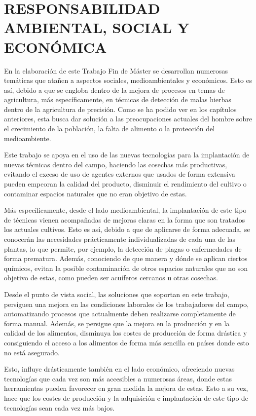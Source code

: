%

\chapter{RESPONSABILIDAD AMBIENTAL, SOCIAL Y ECONÓMICA}
\label{sec:repercusion}

En la elaboración de este Trabajo Fin de Máster se desarrollan numerosas temáticas que atañen a aspectos sociales, medioambientales y económicos. Esto es así, debido a que se engloba dentro de la mejora de procesos en temas de agricultura, más específicamente, en técnicas de detección de malas hierbas dentro de la agricultura de precisión. Como se ha podido ver en los capítulos anteriores, esta busca dar solución a las preocupaciones actuales del hombre sobre el crecimiento de la población, la falta de alimento o la protección del medioambiente.

Este trabajo se apoya en el uso de las nuevas tecnologías para la implantación de nuevas técnicas dentro del campo, haciendo las cosechas más productivas, evitando el exceso de uso de agentes externos que usados de forma extensiva pueden empeoran la calidad del producto, disminuir el rendimiento del cultivo o contaminar espacios naturales que no eran objetivo de estas.

Más específicamente, desde el lado medioambiental, la implantación de este tipo de técnicas vienen acompañadas de mejoras claras en la forma que son tratados los actuales cultivos. Esto es así, debido a que de aplicarse de forma adecuada, se conocerán las necesidades prácticamente individualizadas de cada una de las plantas, lo que permite, por ejemplo, la detección de plagas o enfermedades de forma prematura. Además, conociendo de que manera y dónde se aplican ciertos químicos, evitan la posible contaminación de otros espacios naturales que no son objetivo de estas, como pueden ser acuíferos cercanos u otras cosechas.

Desde el punto de vista social, las soluciones que soportan en este trabajo, persiguen una mejora en las condiciones laborales de los trabajadores del campo, automatizando procesos que actualmente deben realizarse completamente de forma manual. Además, se persigue que la mejora en la producción y en la calidad de los alimentos, disminuya los costes de producción de forma drástica y consiguiendo el acceso a los alimentos de forma más sencilla en países donde esto no está asegurado.

Esto, influye drásticamente también en el lado económico, ofreciendo nuevas tecnologías que cada vez son más accesibles a numerosas áreas, donde estas herramientas pueden favorecer en gran medida la mejora de estas. Esto a su vez, hace que los costes de producción y la adquisición e implantación de este tipo de tecnologías sean cada vez más bajos.

